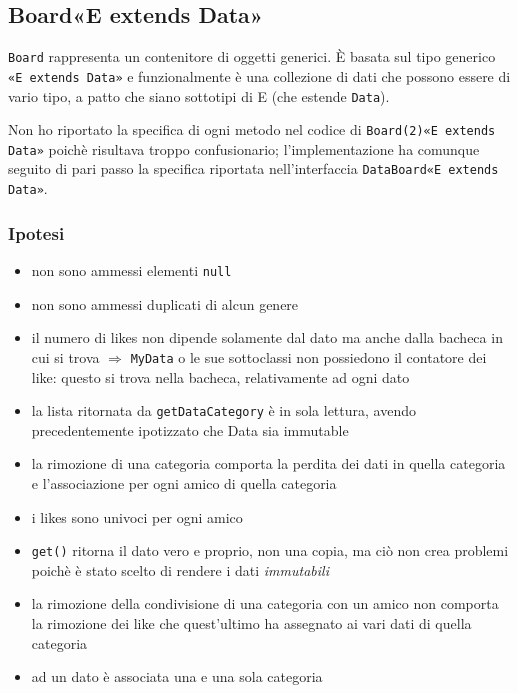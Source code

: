 \documentclass[10pt, a4paper]{article}
\begin{document}
\bigskip
\subsection{Board«E extends Data» }

\texttt{Board} rappresenta un contenitore di oggetti generici. È basata sul tipo generico \texttt{«E extends Data»} e funzionalmente è una collezione di dati che possono essere di vario tipo, a patto che siano sottotipi di E (che estende \texttt{Data}).

Non ho riportato la specifica di ogni metodo nel codice di \texttt{Board(2)«E extends Data»} poichè risultava troppo confusionario; l'implementazione ha comunque seguito di pari passo la specifica riportata nell'interfaccia \texttt{DataBoard«E extends Data»}.
\subsubsection{Ipotesi}
\begin{itemize}
\item non sono ammessi elementi \texttt{null}
\item non sono ammessi duplicati di alcun genere
\item il numero di likes non dipende solamente dal dato ma anche dalla bacheca in cui si trova $\Rightarrow$ \texttt{MyData} o le sue sottoclassi non possiedono il contatore dei like: questo si trova nella bacheca, relativamente ad ogni dato
\item la lista ritornata da \texttt{getDataCategory} è in sola lettura, avendo precedentemente ipotizzato che Data sia immutable
\item la rimozione di una categoria comporta la perdita dei dati in quella categoria e l'associazione per ogni amico di quella categoria
\item i likes sono univoci per ogni amico
\item \texttt{get()} ritorna il dato vero e proprio, non una copia, ma ciò non crea problemi poichè è stato scelto di rendere i dati \textit{immutabili}
\item la rimozione della condivisione di una categoria con un amico non comporta la rimozione dei like che quest'ultimo ha assegnato ai vari dati di quella categoria
\item ad un dato è associata una e una sola categoria
\end{itemize}
\end{document}
